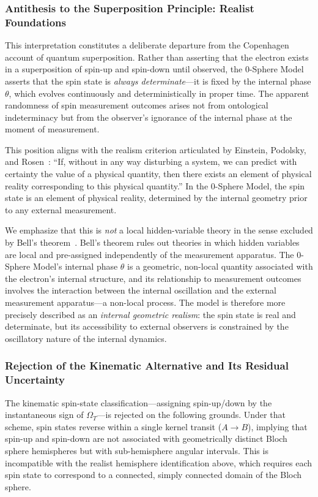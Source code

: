 \documentclass[%
 reprint,
 amsmath,amssymb,
 aps,
 prb,
]{revtex4-2}
\numberwithin{equation}{section}
\theoremstyle{definition}
\theoremstyle{remark}
\begin{document}
\subsubsection{Antithesis to the Superposition Principle: Realist Foundations}

This interpretation constitutes a deliberate departure from the Copenhagen account of quantum superposition. Rather than asserting that the electron exists in a superposition of spin-up and spin-down until observed, the 0-Sphere Model asserts that the spin state is \emph{always determinate}---it is fixed by the internal phase $\theta$, which evolves continuously and deterministically in proper time. The apparent randomness of spin measurement outcomes arises not from ontological indeterminacy but from the observer's ignorance of the internal phase at the moment of measurement.

This position aligns with the realism criterion articulated by Einstein, Podolsky, and Rosen~\cite{EPR1935}: ``If, without in any way disturbing a system, we can predict with certainty the value of a physical quantity, then there exists an element of physical reality corresponding to this physical quantity.'' In the 0-Sphere Model, the spin state is an element of physical reality, determined by the internal geometry prior to any external measurement.

We emphasize that this is \emph{not} a local hidden-variable theory in the sense excluded by Bell's theorem~\cite{Bell1964}. Bell's theorem rules out theories in which hidden variables are local and pre-assigned independently of the measurement apparatus. The 0-Sphere Model's internal phase $\theta$ is a geometric, non-local quantity associated with the electron's internal structure, and its relationship to measurement outcomes involves the interaction between the internal oscillation and the external measurement apparatus---a non-local process. The model is therefore more precisely described as an \emph{internal geometric realism}: the spin state is real and determinate, but its accessibility to external observers is constrained by the oscillatory nature of the internal dynamics.

\subsubsection{Rejection of the Kinematic Alternative and Its Residual Uncertainty}

The kinematic spin-state classification---assigning spin-up/down by the instantaneous sign of $\Omega_T$---is rejected on the following grounds. Under that scheme, spin states reverse within a single kernel transit ($A \to B$), implying that spin-up and spin-down are not associated with geometrically distinct Bloch sphere hemispheres but with sub-hemisphere angular intervals. This is incompatible with the realist hemisphere identification above, which requires each spin state to correspond to a connected, simply connected domain of the Bloch sphere.
\end{document}
